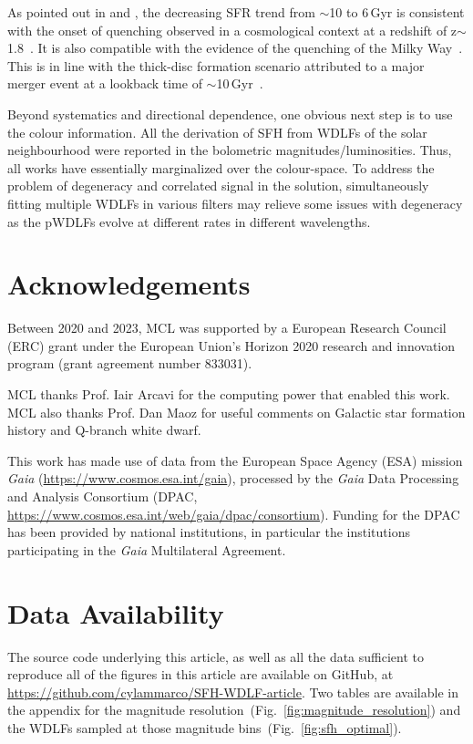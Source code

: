 \documentclass[fleqn,usenatbib]{mnras}
\begin{document}
As pointed out in \citet{2019A&A...624L...1M} and \citet{2019ApJ...878L..11I},
the decreasing SFR trend from $\sim$10 to 6\,Gyr is consistent with the
onset of quenching observed in a cosmological context at a redshift of
z$\sim$1.8~\citep[corresponds to a lookback time of
$\sim$10\,Gyr, e.g.][]{2016MNRAS.461.1100R, 2017MNRAS.471.4155K}. It is
also compatible with the evidence of the quenching of the Milky
Way~\citep{2016A&A...589A..66H}. This is in line with the thick-disc formation
scenario attributed to a major merger event at a lookback time of 
$\sim$10\,Gyr~\citep{2018Natur.563...85H}.

Beyond systematics and directional dependence, one obvious next step is to use
the colour information. All the derivation of SFH from WDLFs of the solar 
neighbourhood were reported in the bolometric magnitudes/luminosities. Thus,
all works have essentially marginalized over the colour-space. To address the
problem of degeneracy and correlated signal in the solution, simultaneously
fitting multiple WDLFs in various filters may relieve some issues with degeneracy
as the pWDLFs evolve at different rates in different wavelengths.


\section*{Acknowledgements}
Between 2020 and 2023, MCL was supported by a European Research Council (ERC)
grant under the European Union’s Horizon 2020 research and innovation program
(grant agreement number 833031).

MCL thanks Prof. Iair Arcavi for the computing power that enabled this work.
MCL also thanks Prof. Dan Maoz for useful comments on Galactic star formation
history and Q-branch white dwarf.

This work has made use of data from the European Space Agency (ESA) mission
\textit{Gaia} (\url{https://www.cosmos.esa.int/gaia}), processed by the \textit{Gaia}
Data Processing and Analysis Consortium (DPAC,
\url{https://www.cosmos.esa.int/web/gaia/dpac/consortium}). Funding for the DPAC
has been provided by national institutions, in particular the institutions
participating in the \textit{Gaia} Multilateral Agreement.


\section*{Data Availability}
The source code underlying this article, as well as all the data sufficient to
reproduce all of the figures in this article are available on GitHub, at 
\url{https://github.com/cylammarco/SFH-WDLF-article}. Two tables are available
in the appendix for the magnitude
resolution~(Fig.~\ref{fig:magnitude_resolution}) and the WDLFs sampled at those
magnitude bins~(Fig.~\ref{fig:sfh_optimal}).
\end{document}
